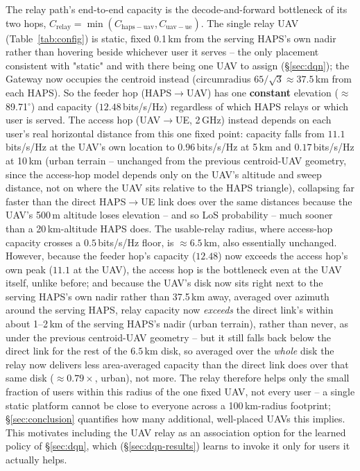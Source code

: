 \documentclass[]{ieeeaccess}
\begin{document}
The relay path's end-to-end capacity is the decode-and-forward bottleneck of its two hops, $C_\mathrm{relay}=\min(C_\mathrm{haps-uav},C_\mathrm{uav-ue})$. The single relay UAV (Table~\ref{tab:config}) is static, fixed 0.1\,km from the serving HAPS's own nadir rather than hovering beside whichever user it serves -- the only placement consistent with "static" and with there being one UAV to assign (\S\ref{sec:dqn}); the Gateway now occupies the centroid instead (circumradius $65/\sqrt{3}\approx37.5$\,km from each HAPS). So the feeder hop (HAPS$\to$UAV) has one \textbf{constant} elevation ($\approx$89.71$^\circ$) and capacity ($12.48$\,bits/s/Hz) regardless of which HAPS relays or which user is served. The access hop (UAV$\to$UE, 2\,GHz) instead depends on each user's real horizontal distance from this one fixed point: capacity falls from $11.1$\,bits/s/Hz at the UAV's own location to $0.96$\,bits/s/Hz at 5\,km and $0.17$\,bits/s/Hz at 10\,km (urban terrain -- unchanged from the previous centroid-UAV geometry, since the access-hop model depends only on the UAV's altitude and sweep distance, not on where the UAV sits relative to the HAPS triangle), collapsing far faster than the direct HAPS$\to$UE link does over the same distances because the UAV's 500\,m altitude loses elevation -- and so LoS probability -- much sooner than a 20\,km-altitude HAPS does. The usable-relay radius, where access-hop capacity crosses a $0.5$\,bits/s/Hz floor, is $\approx6.5$\,km, also essentially unchanged. However, because the feeder hop's capacity ($12.48$) now exceeds the access hop's own peak ($11.1$ at the UAV), the access hop is the bottleneck even at the UAV itself, unlike before; and because the UAV's disk now sits right next to the serving HAPS's own nadir rather than 37.5\,km away, averaged over azimuth around the serving HAPS, relay capacity now \emph{exceeds} the direct link's within about 1--2\,km of the serving HAPS's nadir (urban terrain), rather than never, as under the previous centroid-UAV geometry -- but it still falls back below the direct link for the rest of the $6.5$\,km disk, so averaged over the \emph{whole} disk the relay now delivers less area-averaged capacity than the direct link does over that same disk ($\approx0.79\times$, urban), not more. The relay therefore helps only the small fraction of users within this radius of the one fixed UAV, not every user -- a single static platform cannot be close to everyone across a 100\,km-radius footprint; \S\ref{sec:conclusion} quantifies how many additional, well-placed UAVs this implies. This motivates including the UAV relay as an association option for the learned policy of \S\ref{sec:dqn}, which (\S\ref{sec:dqn-results}) learns to invoke it only for users it actually helps.
\end{document}
